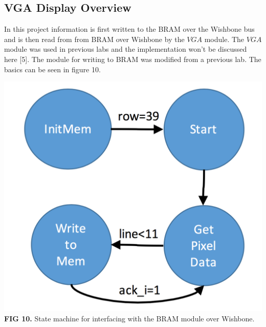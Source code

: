\documentclass{article}
\begin{document}
\subsection{VGA Display Overview}
In this project information is first written to the BRAM over the Wishbone bus and is then read from from BRAM over Wishbone by the $VGA$ module. The $VGA$ module was used in previous labs and the implementation won't be discussed here [5]. The module for writing to BRAM was modified from a previous lab. The basics can be seen in figure 10. 
\begin{center}
\includegraphics[scale=.35]{images/videoState}\\
\textbf{FIG 10.} State machine for interfacing with the BRAM module over Wishbone.\\
\end{center}
\end{document}
